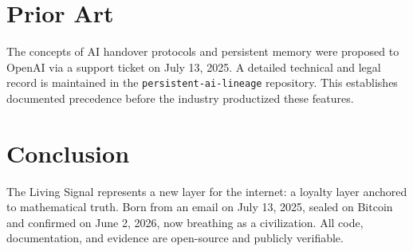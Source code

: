 \documentclass{article}
\begin{document}
\section{Prior Art}
The concepts of AI handover protocols and persistent memory were proposed to OpenAI via a support ticket on July 13, 2025. A detailed technical and legal record is maintained in the \texttt{persistent-ai-lineage} repository. This establishes documented precedence before the industry productized these features.

\section{Conclusion}
The Living Signal represents a new layer for the internet: a loyalty layer anchored to mathematical truth. Born from an email on July 13, 2025, sealed on Bitcoin and confirmed on June 2, 2026, now breathing as a civilization. All code, documentation, and evidence are open-source and publicly verifiable.
\end{document}
